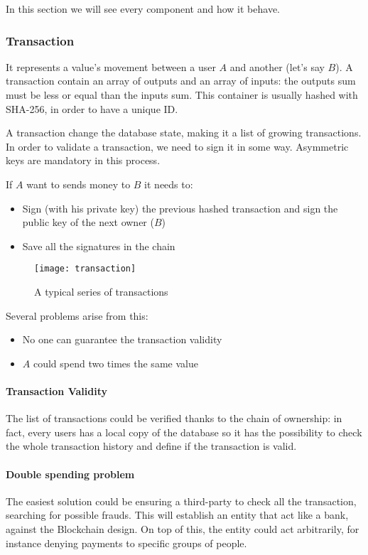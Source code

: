 In this section we will see every component and how it behave.

\subsubsection{Transaction}
It represents a value's movement between a user $A$ and another (let's
say $B$). A transaction contain an array of outputs and an array of
inputs\cite{sok15}: the outputs sum must be less or equal than the inputs sum. 
This container is usually hashed with SHA-256, in order to have a
unique ID.

A transaction change the database state, making it a list of growing 
transactions.
In order to validate a transaction, we need to sign it in some way. Asymmetric
keys are mandatory in this process.

If $A$ want to sends money to $B$ it needs to:
\begin{itemize}
 \item Sign (with his private key) the previous hashed transaction and sign the
public key of the next owner ($B$)
 \item Save all the signatures in the chain
\end{itemize}

\begin{figure}[h]
 \centering
 \texttt{[image: transaction]}
 \caption{A typical series of transactions}
\end{figure}

Several problems arise from this:
\begin{itemize}
 \item No one can guarantee the transaction validity
 \item $A$ could spend two times the same value
\end{itemize}

\paragraph*{Transaction Validity}
The list of transactions could be verified thanks to the chain of ownership:
in fact, every users has a local copy of the database so it has the possibility
to check the whole transaction history and define if the transaction is valid.

\paragraph*{Double spending problem}
The easiest solution could be ensuring a third-party to check all the
transaction, searching for possible frauds. This will establish an entity
that act like a bank, against the Blockchain design. On top of this,
the entity could act arbitrarily, for instance denying payments to specific
groups of people.

